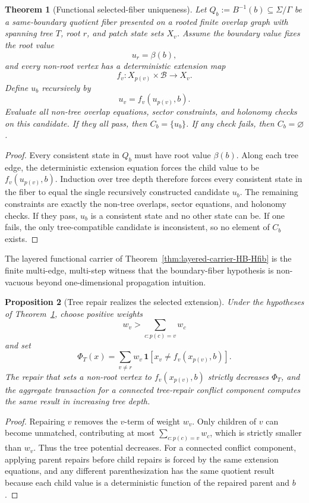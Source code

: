 \documentclass[11pt]{article}
\newtheorem{theorem}{Theorem}[section]
\newtheorem{proposition}[theorem]{Proposition}
\theoremstyle{remark}
\theoremstyle{plain}
\begin{document}
\begin{theorem}[Functional selected-fiber uniqueness]\label{thm:functional-selected-fiber}
Let \(Q_b:=B^{-1}(b)\subseteq\Sigma/\Gamma\) be a same-boundary quotient fiber presented on a
rooted finite overlap graph with spanning tree \(T\), root \(r\), and patch state sets \(X_v\).
Assume the boundary value fixes the root value
\[
u_r=\beta(b),
\]
and every non-root vertex has a deterministic extension map
\[
f_v:X_{p(v)}\times\mathcal B\to X_v .
\]
Define \(u_b\) recursively by
\[
u_v=f_v(u_{p(v)},b).
\]
Evaluate all non-tree overlap equations, sector constraints, and holonomy checks on this
candidate. If they all pass, then \(C_b=\{u_b\}\). If any check fails, then \(C_b=\varnothing\).
\end{theorem}

\begin{proof}
Every consistent state in \(Q_b\) must have root value \(\beta(b)\). Along each tree edge, the
deterministic extension equation forces the child value to be
\(f_v(u_{p(v)},b)\). Induction over tree depth therefore forces every consistent state in the
fiber to equal the single recursively constructed candidate \(u_b\). The remaining constraints are
exactly the non-tree overlaps, sector equations, and holonomy checks. If they pass, \(u_b\) is a
consistent state and no other state can be. If one fails, the only tree-compatible candidate is
inconsistent, so no element of \(C_b\) exists.
\end{proof}

The layered functional carrier of Theorem~\ref{thm:layered-carrier-HB-Hfib} is the finite
multi-edge, multi-step witness that the boundary-fiber hypothesis is non-vacuous beyond
one-dimensional propagation intuition.

\begin{proposition}[Tree repair realizes the selected extension]\label{prop:tree-selected-descent}
Under the hypotheses of Theorem~\ref{thm:functional-selected-fiber}, choose positive weights
\[
w_v>\sum_{c:p(c)=v}w_c
\]
and set
\[
\Phi_T(x)=\sum_{v\ne r}w_v\,\mathbf 1[x_v\ne f_v(x_{p(v)},b)] .
\]
The repair that sets a non-root vertex to \(f_v(x_{p(v)},b)\) strictly decreases \(\Phi_T\), and
the aggregate transaction for a connected tree-repair conflict component computes the same result
in increasing tree depth.
\end{proposition}

\begin{proof}
Repairing \(v\) removes the \(v\)-term of weight \(w_v\). Only children of \(v\) can become
unmatched, contributing at most \(\sum_{c:p(c)=v}w_c\), which is strictly smaller than \(w_v\).
Thus the tree potential decreases. For a connected conflict component, applying parent repairs
before child repairs is forced by the same extension equations, and any different
parenthesization has the same quotient result because each child value is a deterministic function
of the repaired parent and \(b\).
\end{proof}
\end{document}
